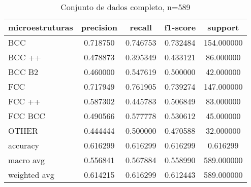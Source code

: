 \begin{table}[htb]
\centering
\caption{Conjunto de dados completo, n=589 }
\begin{supertabular}{l|c|c|c|c}
\hline
{ microestruturas } & { precision } & { recall } & { f1-score } & { support }\\\hline
{ BCC } &           {0.718750} &  {0.746753} & {0.732484} &  {154.000000}\\\hline
{ BCC ++ } &        {0.478873} &  {0.395349} & {0.433121} &  {86.000000}\\\hline
{ BCC B2 } &        {0.460000} &  {0.547619} & {0.500000} &  {42.000000}\\\hline
{ FCC } &           {0.717949} &  {0.761905} & {0.739274} &  {147.000000}\\\hline
{ FCC ++ } &        {0.587302} &  {0.445783} & {0.506849} &  {83.000000}\\\hline
{ FCC BCC } &       {0.490566} &  {0.577778} & {0.530612} &  {45.000000}\\\hline
{ OTHER } &         {0.444444} &  {0.500000} & {0.470588} &  {32.000000}\\\hline
{ accuracy } &      {0.616299} &  {0.616299} & {0.616299} &  {0.616299}\\\hline
{ macro avg } &     {0.556841} &  {0.567884} & {0.558990} &  {589.000000}\\\hline
{ weighted avg } &  {0.614215} &  {0.616299} & {0.612443} &  {589.000000}\\\hline
\end{supertabular}
    \legend{}
    \label{table:relatorio_todos_dados}
\end{table}

\pagebreak


